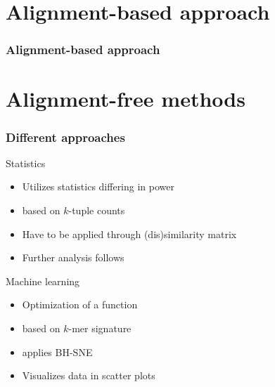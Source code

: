 \documentclass{beamer}
\begin{document}
\section{Alignment-based approach}
\begin{frame}
	\frametitle{Alignment-based approach}
	
\end{frame}
\section{Alignment-free methods}
\begin{frame}
\frametitle{Different approaches}
	\begin{block}{Statistics}
		\begin{itemize}
			\item Utilizes statistics differing in power
			\item based on $k$-tuple counts
			\item Have to be applied through (dis)similarity matrix
			\item Further analysis follows
		\end{itemize}
	\end{block}
\begin{block}{Machine learning}	
	\begin{itemize}
		\item Optimization of a function
		\item based on $k$-mer signature
		\item applies BH-SNE
		\item Visualizes data in scatter plots
	\end{itemize}
\end{block}
\end{frame}
\end{document}
